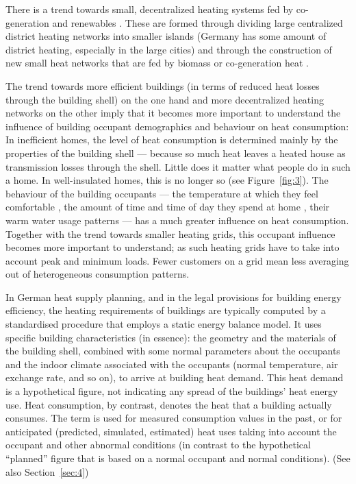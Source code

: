 \documentclass[11pt]{IJM-article}
\begin{document}
There is a trend towards small, decentralized heating systems fed by
co-generation and renewables . These are
formed through dividing large centralized district heating networks into
smaller islands (Germany has some amount of district heating, especially in the
large cities) and through the construction of new small heat networks that are
fed by biomass or co-generation heat .

The trend towards more efficient buildings (in terms of reduced heat losses
through the building shell) on the one hand and more decentralized heating
networks on the other imply that it becomes more important to understand the
influence of building occupant demographics and behaviour on heat
consumption: In inefficient homes, the level of heat consumption is determined
mainly by the properties of the building shell --- because so much heat leaves
a heated house as transmission losses through the shell. Little does it matter
what people do in such a home. In well-insulated homes, this is no longer so
(see Figure~\ref{fig:3}). The behaviour of the building occupants --- the
temperature at which they feel comfortable , the
amount of time and time of day they spend at home , their warm water usage patterns  --- has
a much greater influence on heat consumption.  Together with the trend towards
smaller heating grids, this occupant influence becomes more important to
understand; as such heating grids have to take into account peak and minimum
loads. Fewer customers on a grid mean less averaging out of heterogeneous
consumption patterns.

In German heat supply planning, and in the legal provisions for building energy
efficiency, the heating requirements of buildings are typically computed by a
standardised procedure that employs a static energy balance model. It uses
specific building characteristics (in essence): the geometry and the materials
of the building shell, combined with some normal parameters about the occupants
and the indoor climate associated with the occupants (normal temperature, air
exchange rate, and so on), to arrive at building heat demand. This heat demand
is a hypothetical figure, not indicating any spread of the buildings' heat
energy use. Heat consumption, by contrast, denotes the heat that a building
actually consumes. The term is used for measured consumption values in the
past, or for anticipated (predicted, simulated, estimated) heat uses taking
into account the occupant and other abnormal conditions (in contrast to the
hypothetical ``planned'' figure that is based on a normal occupant and normal
conditions). (See also Section~\ref{sec:4})
\end{document}
